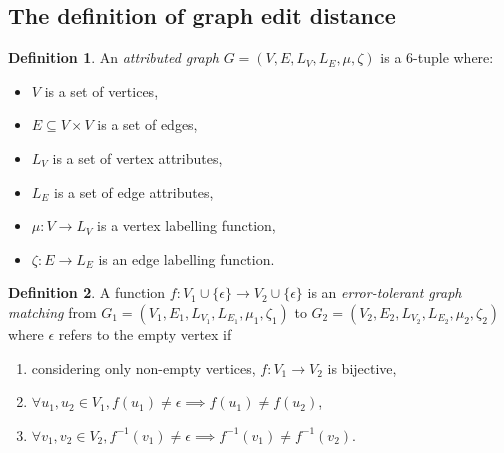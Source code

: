 \documentclass{article}
\theoremstyle{definition}
\newtheorem{definition}{Definition}
\begin{document}
\subsection{The definition of graph edit distance}
\label{sec:ged}
\begin{definition}
  An \emph{attributed graph} $G = (V, E, L_V, L_E, \mu, \zeta)$ is a 6-tuple where:
  \begin{itemize}
  \item $V$ is a set of vertices,
  \item $E \subseteq V \times V$ is a set of edges,
  \item $L_V$ is a set of vertex attributes,
  \item $L_E$ is a set of edge attributes,
  \item $\mu : V \to L_V$ is a vertex labelling function,
  \item $\zeta : E \to L_E$ is an edge labelling function.
  \end{itemize}
\end{definition}
\begin{definition}
  A function $f: V_1 \cup \{ \epsilon \} \to V_2 \cup \{ \epsilon \}$ is an \emph{error-tolerant graph matching} from $G_1 = (V_1, E_1, L_{V_1}, L_{E_1}, \mu_1, \zeta_1)$ to $G_2 = (V_2, E_2, L_{V_2}, L_{E_2}, \mu_2, \zeta_2)$ where $\epsilon$ refers to the empty vertex if
  \begin{enumerate}
  \item considering only non-empty vertices, $f: V_1 \to V_2$ is bijective,
  \item $\forall u_1, u_2 \in V_1, f(u_1) \ne \epsilon \implies f(u_1) \ne f(u_2)$,
  \item $\forall v_1, v_2 \in V_2, f^{-1}(v_1) \ne \epsilon \implies f^{-1}(v_1) \ne f^{-1}(v_2)$.
  \end{enumerate}
\end{definition}
\end{document}
